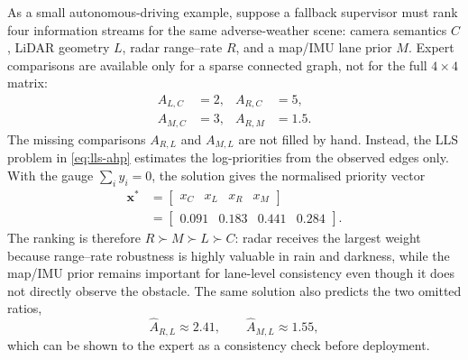 \documentclass[graybox,envcountchap]{style/SNmono}
\begin{document}
\smallskip
\begin{example}
As a small autonomous-driving example, suppose a fallback supervisor must rank four information streams for the same adverse-weather scene: camera semantics \(C\), LiDAR geometry \(L\), radar range--rate \(R\), and a map/IMU lane prior \(M\). Expert comparisons are available only for a sparse connected graph, not for the full \(4\times4\) matrix:
\[
\begin{aligned}
A_{L,C}&=2, & A_{R,C}&=5,\\
A_{M,C}&=3, & A_{R,M}&=1.5 .
\end{aligned}
\]
The missing comparisons \(A_{R,L}\) and \(A_{M,L}\) are not filled by hand. Instead, the LLS problem in \eqref{eq:lls-ahp} estimates the log-priorities from the observed edges only. With the gauge \(\sum_i y_i=0\), the solution gives the normalised priority vector
\begin{equation}
\begin{aligned}
\bm{x}^{*}
&=\begin{bmatrix}x_C & x_L & x_R & x_M\end{bmatrix}\\
&=\begin{bmatrix}0.091 & 0.183 & 0.441 & 0.284\end{bmatrix}.
\end{aligned}
\label{eq:incomplete-ahp-example-weights}
\end{equation}
The ranking is therefore \(R \succ M \succ L \succ C\): radar receives the largest weight because range--rate robustness is highly valuable in rain and darkness, while the map/IMU prior remains important for lane-level consistency even though it does not directly observe the obstacle. The same solution also predicts the two omitted ratios,
\begin{equation}
\widehat{A}_{R,L}\approx2.41,\qquad
\widehat{A}_{M,L}\approx1.55,
\end{equation}
which can be shown to the expert as a consistency check before deployment.

\begin{figure}[t]
    \centering
\end{figure}
\end{example}
\end{document}
